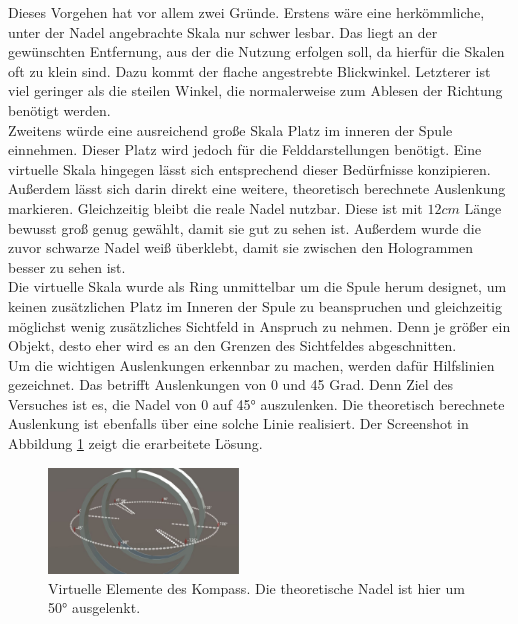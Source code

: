 Dieses Vorgehen hat vor allem zwei Gründe. Erstens wäre eine herkömmliche, unter der Nadel angebrachte Skala nur schwer lesbar. Das liegt an der gewünschten Entfernung, aus der die Nutzung erfolgen soll, da hierfür die Skalen oft zu klein sind. Dazu kommt der flache angestrebte Blickwinkel. Letzterer ist viel geringer als die steilen Winkel, die normalerweise zum Ablesen der Richtung benötigt werden.\\
\noindent\hspace*{5mm}
Zweitens würde eine ausreichend große Skala Platz im inneren der Spule einnehmen. Dieser Platz wird jedoch für die Felddarstellungen benötigt. Eine virtuelle Skala hingegen lässt sich entsprechend dieser Bedürfnisse konzipieren. Außerdem lässt sich darin direkt eine weitere, theoretisch berechnete Auslenkung markieren. Gleichzeitig bleibt die reale Nadel nutzbar. Diese ist mit $12 cm$ Länge bewusst groß genug gewählt, damit sie gut zu sehen ist. Außerdem wurde die zuvor schwarze Nadel weiß überklebt, damit sie zwischen den Hologrammen besser zu sehen ist.\\

Die virtuelle Skala wurde als Ring unmittelbar um die Spule herum designet, um keinen zusätzlichen Platz im Inneren der Spule zu beanspruchen und gleichzeitig möglichst wenig zusätzliches Sichtfeld in Anspruch zu nehmen. Denn je größer ein Objekt, desto eher wird es an den Grenzen des Sichtfeldes abgeschnitten.\\
\noindent\hspace*{5mm}
Um die wichtigen Auslenkungen erkennbar zu machen, werden dafür Hilfslinien gezeichnet. Das betrifft Auslenkungen von 0 und 45 Grad. Denn Ziel des Versuches ist es, die Nadel von 0 auf 45° auszulenken. Die theoretisch berechnete Auslenkung ist ebenfalls über eine solche Linie realisiert. Der Screenshot in Abbildung \ref{img:compass} zeigt die erarbeitete Lösung.

\begin{figure}
	\centering
	\includegraphics[width=0.45\textwidth]{images/unity/compass.jpg}
	\caption{Virtuelle Elemente des Kompass. Die theoretische Nadel ist hier um 50° ausgelenkt.}
	\label{img:compass}
\end{figure}


